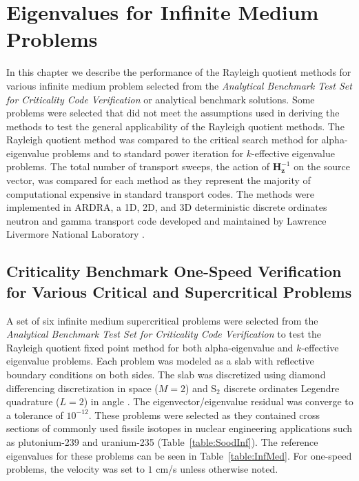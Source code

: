 \chapter{Eigenvalues for Infinite Medium Problems}%

In this chapter we describe the performance of the Rayleigh quotient methods for various infinite medium problem selected from the \textit{Analytical Benchmark Test Set for Criticality Code Verification} \cite{sood2003analytical} or analytical benchmark solutions. Some problems were selected that did not meet the assumptions used in deriving the methods to test the general applicability of the Rayleigh quotient methods. The Rayleigh quotient method was compared to the critical search method \cite{hill_efficient_1983} for alpha-eigenvalue problems and to standard power iteration for $k$-effective eigenvalue problems. The total number of transport sweeps, the action of $\mathbf{H}_{\mathbf{z}}^{-1}$ on the source vector, was compared for each method as they represent the majority of computational expensive in standard transport codes. The methods were implemented in ARDRA, a 1D, 2D, and 3D deterministic discrete ordinates neutron and gamma transport code developed and maintained by Lawrence Livermore National Laboratory \cite{hanebutte_ardra_1999}.

\section{Criticality Benchmark One-Speed Verification for Various Critical and Supercritical Problems}

A set of six infinite medium supercritical problems were selected from the \textit{Analytical Benchmark Test Set for Criticality Code Verification} \cite{sood2003analytical} to test the Rayleigh quotient fixed point method for both alpha-eigenvalue and $k$-effective eigenvalue problems. Each problem was modeled as a slab with reflective boundary conditions on both sides. The slab was discretized using diamond differencing discretization in space ($M = 2$) and S$_{2}$ discrete ordinates Legendre quadrature ($L = 2$) in angle \cite{lewis_computational_1984}. The eigenvector/eigenvalue residual was converge to a tolerance of $10^{-12}$. These problems were selected as they contained cross sections of commonly used fissile isotopes in nuclear engineering applications such as plutonium-239 and uranium-235 (Table~\ref{table:SoodInf}). The reference eigenvalues for these problems can be seen in Table~\ref{table:InfMed}. For one-speed problems, the velocity was set to $1$ cm/s unless otherwise noted.


